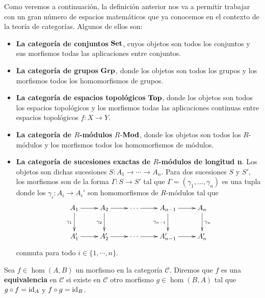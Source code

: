 \begin{ejemplo}
	Como veremos a continuación, la definición anterior nos va a permitir trabajar
	con un gran número de espacios matemáticos que ya conocemos en el contexto de
	la teoría de categorías. Algunos de ellos son:
	\begin{itemize}
		\item \textbf{La categoría de conjuntos} \(\mathbf{Set}\), cuyos objetos son todos
		los conjuntos y sus morfismos todas las aplicaciones entre conjuntos.
		
		\item \textbf{La categoría de grupos} \(\mathbf{Grp}\), donde los objetos son todos
		los grupos y los morfismos todos los homomorfismos de grupos.
		
		\item \textbf{La categoría de espacios topológicos} \(\mathbf{Top}\), donde los objetos
		son todos los espacios topológicos y los morfismos todas las aplicaciones continuas
		entre espacios topológicos \(f: X \rightarrow Y\).
		
		\item \textbf{La categoría de \(R\)-módulos} \(R\)-\(\mathbf{Mod}\), donde los objetos
		son todos los \(R\)-módulos y los morfismos todos los homomorfismos de módulos.
		
		\item \textbf{La categoría de sucesiones exactas de \(R\)-módulos de longitud
			n}. Los objetos son dichas sucesiones \(S: A_{1}\rightarrow \cdots \rightarrow
		A_{n}\). Para dos sucesiones \(S\) y \(S'\), los morfismos son de la forma \(\Gamma
		: S \rightarrow S'\) tal que \(\Gamma = (\gamma_{1}, \ldots, \gamma_{n})\) es
		una tupla donde los \(\gamma_{i}: A_{i}\rightarrow A_{i}'\) son homomorfismos
		de \(R\)-módulos tal que
		\begin{equation}
			\label{exactseqcat}\xymatrix{ A_1 \ar[r] \ar[d]_{\gamma_1} & A_2 \ar[r] \ar[d]_{\gamma_2} & \cdots \ar[r] & A_{n-1} \ar[r] \ar[d]_{\gamma_{n-1}} & A_n \ar[d]^{\gamma_n} \\ A'_1 \ar[r] & A'_2 \ar[r] & \cdots \ar[r] & A'_{n-1} \ar[r] & A'_n }
		\end{equation}
		conmuta para todo \(i \in \{ 1, \cdots, n \}\).
	\end{itemize}
\end{ejemplo}

\begin{definicion}
	Sea \(f \in \hom(A,B)\) un morfismo en la categoría \(\mathcal{C}\). Diremos que
	\(f\) es una \textbf{equivalencia} en \(\mathcal{C}\) si existe en \(\mathcal{C}\) otro
	morfismo \(g \in \hom(B,A)\) tal que \(g \circ f = \operatorname{id}_{A}\) y \(f \circ g = \operatorname{id}_{B}\).
\end{definicion}

